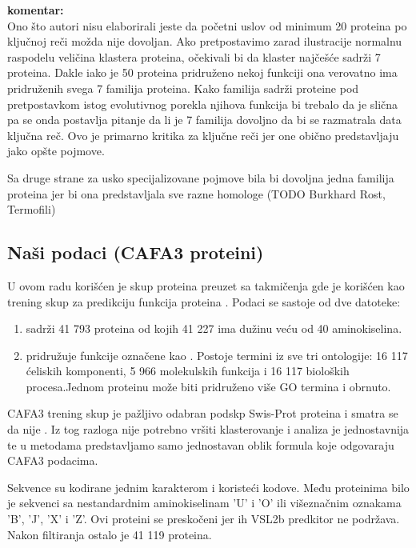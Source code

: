 \textbf{komentar:} \\
Ono što autori nisu elaborirali jeste da početni uslov od minimum 20 proteina
po ključnoj reči možda nije dovoljan. Ako pretpostavimo zarad ilustracije
normalnu raspodelu veličina klastera proteina, očekivali bi da klaster najčešće
sadrži 7 proteina. Dakle iako je 50 proteina pridruženo nekoj funkciji ona
verovatno ima pridruženih svega 7 familija proteina. Kako familija sadrži
proteine pod pretpostavkom istog evolutivnog porekla njihova funkcija bi
trebalo da je slična pa se onda postavlja pitanje da li je 7 familija dovoljno
da bi se razmatrala data ključna reč. Ovo je primarno kritika za ključne reči
jer one obično predstavljaju jako opšte pojmove.

Sa druge strane za usko specijalizovane pojmove bila bi dovoljna jedna familija
proteina jer bi ona predstavljala sve razne homologe (TODO Burkhard Rost,
Termofili)



\subsection{Naši podaci (CAFA3 proteini)}

U ovom radu korišćen je skup proteina preuzet sa  takmičenja gde
je korišćen kao trening skup za predikciju funkcija proteina \parencite{CAFA}.
Podaci se sastoje od dve datoteke:

\begin{enumerate}
  \item {}  sadrži 41 793 proteina od kojih
         41 227 ima dužinu veću od 40 aminokiselina.
  \item {} pridružuje funkcije označene kao
         . Postoje
        termini iz sve tri ontologije: 16 117 ćeliskih komponenti,
        5 966 molekulskih funkcija i 16 117 bioloških procesa.Jednom proteinu
        može biti pridruženo više GO termina i obrnuto.
\end{enumerate}

CAFA3 trening skup je pažljivo odabran podskp Swis-Prot proteina i smatra se da
nije  \parencite{??}. Iz tog razloga nije
potrebno vršiti klasterovanje i analiza je jednostavnija te u metodama
predstavljamo samo jednostavan oblik formula koje odgovaraju CAFA3 podacima.

Sekvence su kodirane jednim karakterom i koristeći  kodove.
Među proteinima bilo je sekvenci sa nestandardnim aminokiselinam 'U'
i 'O' ili višeznačnim oznakama 'B', 'J', 'X' i 'Z'. Ovi proteini se preskočeni jer
ih VSL2b predkitor ne podržava. Nakon filtiranja ostalo je 41 119 proteina.

